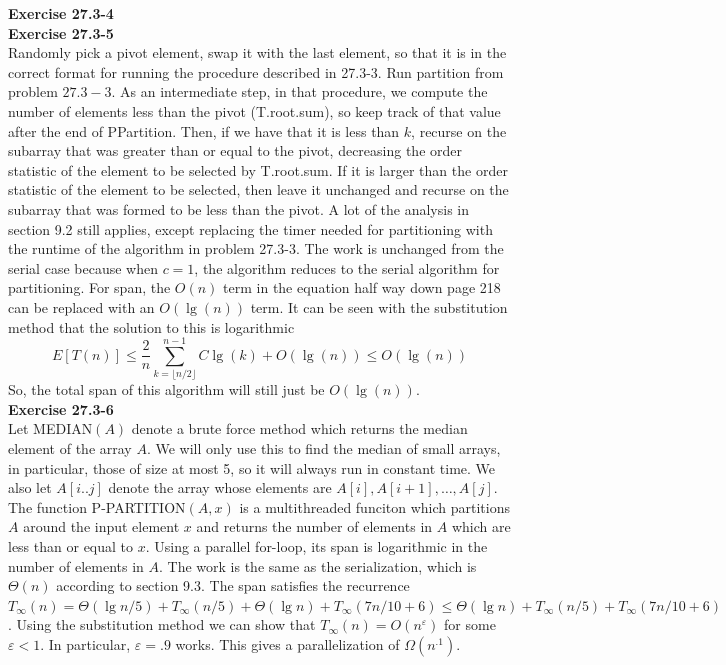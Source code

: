 \documentclass{article}
\begin{document}
\noindent\textbf{Exercise 27.3-4}\\


\noindent\textbf{Exercise 27.3-5}\\

Randomly pick a pivot element, swap it with the last element, so that it is in the correct format for running the procedure described in 27.3-3.
Run partition from problem $27.3-3$. As an intermediate step, in that procedure, we compute the number of elements less than the pivot (T.root.sum), so keep track of that value after the end of PPartition. Then, if we have that it is less than $k$, recurse on the subarray that was greater than or equal to the pivot, decreasing the order statistic of the element to be selected by T.root.sum. If it is larger than the order statistic of the element to be selected, then leave it unchanged and recurse on the subarray that was formed to be less than the pivot. A lot of the analysis in section 9.2 still applies, except replacing the timer needed for partitioning with the runtime of the algorithm in problem 27.3-3. The work is unchanged from the serial case because when $c=1$, the algorithm reduces to the serial algorithm for partitioning. For span, the $O(n)$ term in the equation half way down page 218 can be replaced with an $O(\lg(n))$ term. It can be seen with the substitution method that the solution to this is logarithmic
\[
E[T(n)] \le \frac{2}{n} \sum_{k=\lfloor n/2\rfloor}^{n-1} C \lg(k) + O(\lg(n)) \le O(\lg(n)) 
\]
So, the total span of this algorithm will still just be $O(\lg(n))$.\\

\noindent\textbf{Exercise 27.3-6}\\

Let MEDIAN$(A)$ denote a brute force method which returns the median element of the array $A$.  We will only use this to find the median of small arrays, in particular, those of size at most 5, so it will always run in constant time.  We also let $A[i..j]$ denote the array whose elements are $A[i], A[i+1], \ldots, A[j]$.  The function P-PARTITION$(A,x)$ is a multithreaded funciton which partitions $A$ around the input element $x$ and returns the number of elements in $A$ which are less than or equal to $x$. Using a parallel for-loop, its span is logarithmic in the number of elements in $A$.  The work is the same as the serialization, which is $\Theta(n)$ according to section 9.3.  The span satisfies the recurrence $T_\infty(n) = \Theta(\lg n/5) + T_\infty(n/5) + \Theta(\lg n) + T_\infty(7n/10 + 6) \leq \Theta(\lg n) + T_\infty(n/5) + T_\infty(7n/10 + 6)$.  Using the substitution method we can show that $T_\infty(n) = O(n^\varepsilon)$ for some $\varepsilon < 1$.  In particular, $\varepsilon = .9$ works.  This gives a parallelization of $\Omega(n^{.1})$.\\
\end{document}
